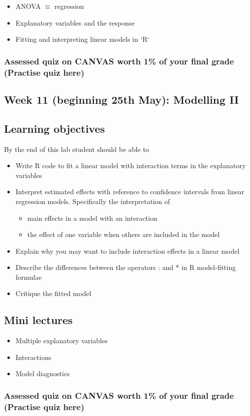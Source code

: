 \documentclass{article}
\begin{document}
\begin{itemize}
\item ANOVA $\equiv$ regression
\item Explanatory variables and the response
\item Fitting and interpreting linear models in `R`
\end{itemize}


\subsubsection*{Assessed quiz on CANVAS worth 1\% of your final grade (Practise quiz here)}

\newpage

\subsection*{Week 11 (beginning 25th May): Modelling II}
\subsection*{Learning objectives}
By the end of this lab student should be able to
\begin{itemize}
\item Write R code to fit a linear model with interaction terms in the explanatory variables
\item Interpret estimated effects with reference to confidence intervals from linear regression models. Specifically the interpretation of
  \begin{itemize}
  \item main effects in a model with an interaction
  \item the effect of one variable when others are included in the model
  \end{itemize}
\item Explain why you may want to include interaction effects in a linear model
\item Describe the differences between the operators : and * in R model-fitting formulae
\item Critique the fitted model
\end{itemize}

\subsection*{Mini lectures}

\begin{itemize}
\item Multiple explanatory variables
\item Interactions
\item Model diagnostics
\end{itemize}

\subsubsection*{Assessed quiz on CANVAS worth 1\% of your final grade (Practise quiz here)}
\end{document}
